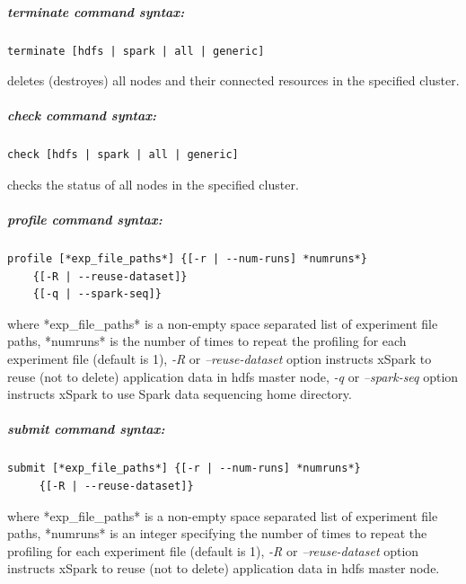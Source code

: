 \hypertarget{terminate-command-syntax}{%
\subparagraph{\texorpdfstring{\emph{terminate} command
		syntax:}{terminate command syntax:}}\label{terminate-command-syntax}}

\begin{verbatim}
terminate [hdfs | spark | all | generic]
\end{verbatim}

deletes (destroyes) all nodes and their connected resources in the
specified cluster.

\hypertarget{check-command-syntax}{%
\subparagraph{\texorpdfstring{\emph{check} command
		syntax:}{check command syntax:}}\label{check-command-syntax}}

\begin{verbatim}
check [hdfs | spark | all | generic]
\end{verbatim}

checks the status of all nodes in the specified cluster.

\hypertarget{profile-command-syntax}{%
\subparagraph{\texorpdfstring{\emph{profile} command
		syntax:}{profile command syntax:}}\label{profile-command-syntax}}

\begin{verbatim}
profile [*exp_file_paths*] {[-r | --num-runs] *numruns*} 
    {[-R | --reuse-dataset]} 
    {[-q | --spark-seq]}      
\end{verbatim}

where *exp\_file\_paths* is a non-empty space separated list of
experiment file paths, *numruns* is the number of times to repeat the
profiling for each experiment file (default is 1), \emph{-R} or
\emph{--reuse-dataset} option instructs xSpark to reuse (not to delete)
application data in hdfs master node, \emph{-q} or \emph{--spark-seq}
option instructs xSpark to use Spark data sequencing home directory.

\hypertarget{submit-command-syntax}{%
\subparagraph{\texorpdfstring{\emph{submit} command
		syntax:}{submit command syntax:}}\label{submit-command-syntax}}

\begin{verbatim}
submit [*exp_file_paths*] {[-r | --num-runs] *numruns*} 
     {[-R | --reuse-dataset]}      
\end{verbatim}

where *exp\_file\_paths* is a non-empty space separated list of
experiment file paths, *numruns* is an integer specifying the number of
times to repeat the profiling for each experiment file (default is 1),
\emph{-R} or \emph{--reuse-dataset} option instructs xSpark to reuse
(not to delete) application data in hdfs master node.

